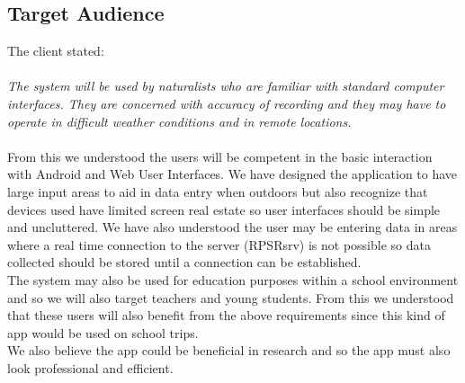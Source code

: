 \subsection{Target Audience}
	The client stated: \\ \\
		\indent \textit{The system will be used by naturalists who are familiar with standard computer interfaces. They are concerned with accuracy of recording and they may have to operate in difficult weather conditions and in remote locations.}\\ \\

	From this we understood the users will be competent in the basic interaction with Android and Web User Interfaces. We have designed the application to have large input areas to aid in data entry when outdoors but also recognize that devices used have limited screen real estate so user interfaces should be simple and uncluttered. We have also understood the user may be entering data in areas where a real time connection to the server (RPSRsrv) is not possible so data collected should be stored until a connection can be established.\\

	The system may also be used for education purposes within a school environment and so we will also target teachers and young students. From this we understood that these users will also benefit from the above requirements since this kind of app would be used on school trips.\\
	
	We also believe the app could be beneficial in research and so the app must also look professional and efficient. \\
